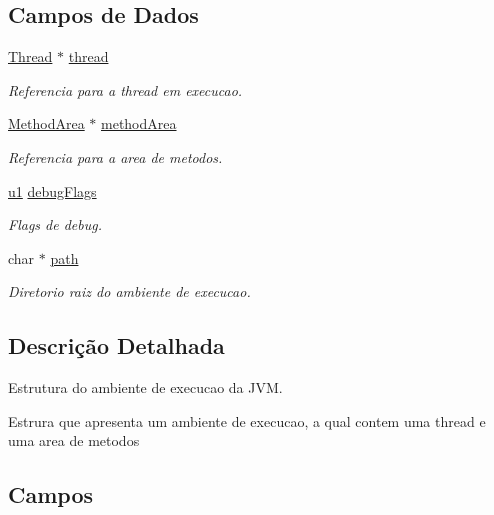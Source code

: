 \subsection*{Campos de Dados}
\begin{DoxyCompactItemize}
\item 
\hyperlink{struct_thread}{Thread} $\ast$ \hyperlink{struct_environment_a9521ae1091a45875768bdbbe0a339014}{thread}
\begin{DoxyCompactList}\small\item\em Referencia para a thread em execucao. \end{DoxyCompactList}\item 
\hyperlink{struct_method_area}{Method\+Area} $\ast$ \hyperlink{struct_environment_a1c73c41c6c38e7e67ea22f6d59044852}{method\+Area}
\begin{DoxyCompactList}\small\item\em Referencia para a area de metodos. \end{DoxyCompactList}\item 
\hyperlink{_e___j_v_m_8h_a216a9f8b04b4f0af84a4ca9d1d85a6ca}{u1} \hyperlink{struct_environment_a8c0e2258ed60e94b0c7a66eac8e27e64}{debug\+Flags}
\begin{DoxyCompactList}\small\item\em Flags de debug. \end{DoxyCompactList}\item 
char $\ast$ \hyperlink{struct_environment_accb313aa6b20e1c01b21021e734ec7ea}{path}
\begin{DoxyCompactList}\small\item\em Diretorio raiz do ambiente de execucao. \end{DoxyCompactList}\end{DoxyCompactItemize}


\subsection{Descrição Detalhada}
Estrutura do ambiente de execucao da J\+V\+M. 

Estrura que apresenta um ambiente de execucao, a qual contem uma thread e uma area de metodos 

\subsection{Campos}
\hypertarget{struct_environment_a8c0e2258ed60e94b0c7a66eac8e27e64}{}
